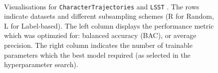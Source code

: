 \documentclass{article}
\begin{document}
\begin{figure}[tbp]
{  }\\%
  \caption{%
    Visualisations for \texttt{CharacterTrajectories} and \texttt{LSST} . The rows indicate datasets and different subsampling schemes (R for Random, L for Label-based). The left column displays the performance metric which was optimzied for: balanced accuracy (BAC), or average precision. The right column indicates the number of trainable parameters which the best model required (as selected in the hyperparameter search).
  }
  \label{supp: barplots1}
\end{figure}
\end{document}
